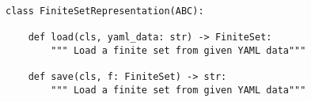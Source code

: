 \begin{verbatim}
class FiniteSetRepresentation(ABC):

    def load(cls, yaml_data: str) -> FiniteSet:
        """ Load a finite set from given YAML data"""

    def save(cls, f: FiniteSet) -> str:
        """ Load a finite set from given YAML data"""
\end{verbatim}